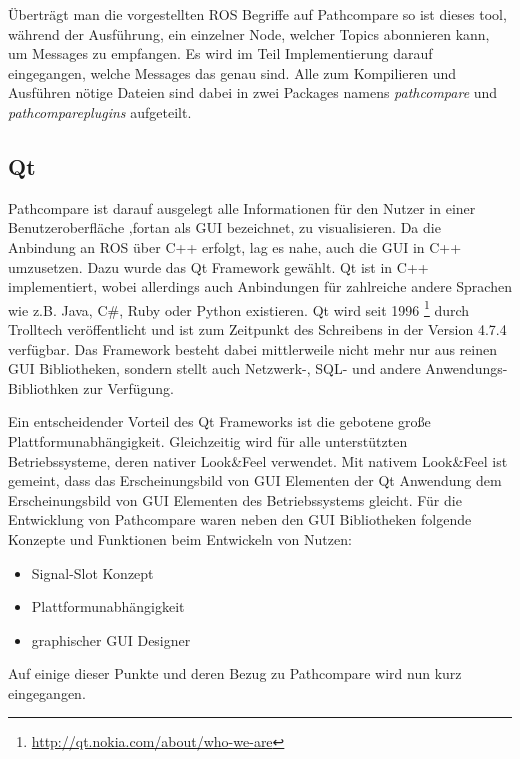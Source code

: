 Überträgt man die vorgestellten ROS Begriffe auf Pathcompare so ist
dieses tool, während der Ausführung,
ein einzelner Node, welcher Topics abonnieren kann, um
Messages zu empfangen. Es wird im Teil Implementierung darauf
eingegangen, welche Messages das genau sind. Alle zum Kompilieren und
Ausführen nötige Dateien sind dabei in zwei Packages namens
\textit{pathcompare} und \textit{pathcompareplugins} aufgeteilt.

\subsection{Qt}

Pathcompare ist darauf ausgelegt alle Informationen für den Nutzer in einer
Benutzeroberfläche ,fortan als GUI bezeichnet, zu visualisieren.  Da die
Anbindung an ROS über C++ erfolgt, lag es nahe, auch die GUI in C++ umzusetzen.
Dazu wurde das Qt Framework gewählt. Qt ist in C++ implementiert, wobei
allerdings auch Anbindungen für zahlreiche andere Sprachen wie z.B.  Java, C\#,
Ruby oder Python existieren. Qt wird seit 1996
\footnote{\url{http://qt.nokia.com/about/who-we-are}} durch Trolltech
veröffentlicht und ist zum Zeitpunkt des Schreibens in der Version 4.7.4
verfügbar. Das Framework besteht dabei mittlerweile nicht mehr nur aus reinen
GUI Bibliotheken, sondern stellt auch Netzwerk-, SQL- und andere
Anwendungs-Bibliothken zur Verfügung.

Ein entscheidender Vorteil des Qt Frameworks ist die gebotene große
Plattformunabhängigkeit.  Gleichzeitig wird für alle unterstützten
Betriebssysteme, deren nativer Look\&Feel verwendet. Mit nativem Look\&Feel
ist gemeint, dass das Erscheinungsbild von GUI Elementen der Qt Anwendung
dem Erscheinungsbild von GUI Elementen des Betriebssystems gleicht.  Für die
Entwicklung von Pathcompare waren neben den GUI Bibliotheken 
folgende Konzepte und Funktionen beim Entwickeln von Nutzen: 
\begin{itemize}
  \item Signal-Slot Konzept
  \item Plattformunabhängigkeit
  \item graphischer GUI Designer 
\end{itemize}

Auf einige dieser Punkte und deren Bezug zu Pathcompare wird nun kurz eingegangen.

